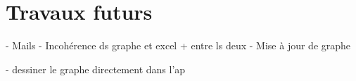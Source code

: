 \chapter{Travaux futurs}
\label{futur_work}
- Mails
- Incohérence ds graphe et excel + entre ls deux
- Mise à jour de graphe

- dessiner le graphe directement dans l'ap
